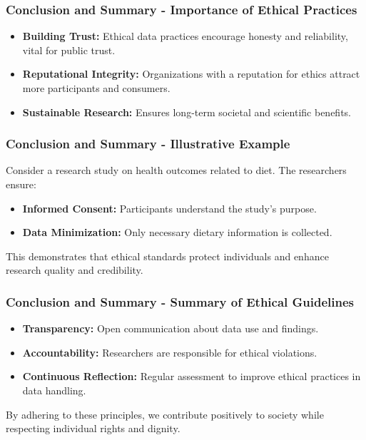 \documentclass[aspectratio=169]{beamer}
\begin{document}
\begin{frame}[fragile]
    \frametitle{Conclusion and Summary - Importance of Ethical Practices}
    \begin{itemize}
        \item \textbf{Building Trust:} Ethical data practices encourage honesty and reliability, vital for public trust.
        \item \textbf{Reputational Integrity:} Organizations with a reputation for ethics attract more participants and consumers.
        \item \textbf{Sustainable Research:} Ensures long-term societal and scientific benefits.
    \end{itemize}
\end{frame}

\begin{frame}[fragile]
    \frametitle{Conclusion and Summary - Illustrative Example}
    Consider a research study on health outcomes related to diet. The researchers ensure:
    \begin{itemize}
        \item \textbf{Informed Consent:} Participants understand the study's purpose.
        \item \textbf{Data Minimization:} Only necessary dietary information is collected.
    \end{itemize}

    This demonstrates that ethical standards protect individuals and enhance research quality and credibility.
\end{frame}

\begin{frame}[fragile]
    \frametitle{Conclusion and Summary - Summary of Ethical Guidelines}
    \begin{itemize}
        \item \textbf{Transparency:} Open communication about data use and findings.
        \item \textbf{Accountability:} Researchers are responsible for ethical violations.
        \item \textbf{Continuous Reflection:} Regular assessment to improve ethical practices in data handling.
    \end{itemize}

    By adhering to these principles, we contribute positively to society while respecting individual rights and dignity.
\end{frame}
\end{document}
